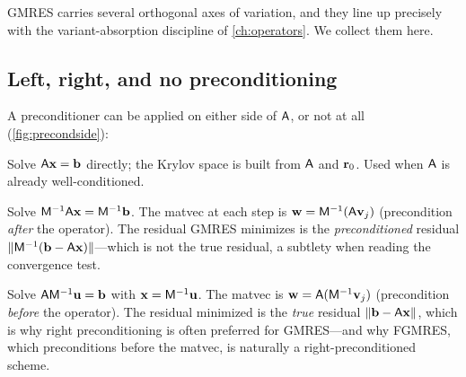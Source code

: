 GMRES carries several orthogonal axes of variation, and they line up precisely with
the variant-absorption discipline of \cref{ch:operators}. We collect them here.

\subsection{Left, right, and no preconditioning}

A preconditioner can be applied on either side of $\mathsf{A}$, or not at all
(\cref{fig:precondside}):
\begin{description}[style=nextline,leftmargin=1.5em]
  \item[None.] Solve $\mathsf{A}\mathbf{x}=\mathbf{b}$ directly; the Krylov space is built from
  $\mathsf{A}$ and $\mathbf{r}_0$. Used when $\mathsf{A}$ is already well-conditioned.
  \item[Left.] Solve $\mathsf{M}^{-1}\mathsf{A}\mathbf{x}=\mathsf{M}^{-1}\mathbf{b}$. The matvec at each step
  is $\mathbf{w}=\mathsf{M}^{-1}(\mathsf{A}\mathbf{v}_j)$ (precondition \emph{after} the operator). The
  residual GMRES minimizes is the \emph{preconditioned} residual
  $\lVert\mathsf{M}^{-1}(\mathbf{b}-\mathsf{A}\mathbf{x})\rVert$---which is not the true residual, a subtlety
  when reading the convergence test.
  \item[Right.] Solve $\mathsf{A}\mathsf{M}^{-1}\mathbf{u}=\mathbf{b}$ with $\mathbf{x}=\mathsf{M}^{-1}\mathbf{u}$. The
  matvec is $\mathbf{w}=\mathsf{A}(\mathsf{M}^{-1}\mathbf{v}_j)$ (precondition \emph{before} the operator).
  The residual minimized is the \emph{true} residual $\lVert\mathbf{b}-\mathsf{A}\mathbf{x}\rVert$, which is
  why right preconditioning is often preferred for GMRES---and why FGMRES, which
  preconditions before the matvec, is naturally a right-preconditioned scheme.
\end{description}

